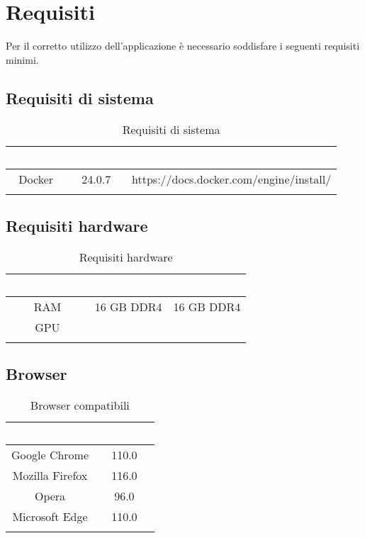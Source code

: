 \chapter{Requisiti} \label{cap:Req}
Per il corretto utilizzo dell'applicazione è necessario soddisfare i seguenti requisiti minimi.

\section{Requisiti di sistema}
\begingroup
\setlength{\tabcolsep}{10pt}
\renewcommand{\arraystretch}{1.5}
\begin{xltabular}{\textwidth}{| c | c | X |}
    \hline
     \textbf{\textcolor{white}{Software}} & \textbf{\textcolor{white}{Versione}} & \textbf{\textcolor{white}{Download}}\\
    \hline
    \endhead
    Docker & 24.0.7 & https://docs.docker.com/engine/install/ \\
    \hline
     \caption{Requisiti di sistema}
    \label{tab:reqsist}
\end{xltabular}
\endgroup

\section{Requisiti hardware}
\begingroup
\setlength{\tabcolsep}{10pt}
\renewcommand{\arraystretch}{1.5}
\begin{xltabular}{\textwidth}{| c | c | c |}
    \hline
     \textbf{\textcolor{white}{Componente}} & \textbf{\textcolor{white}{Minimo}} & \textbf{\textcolor{white}{Consigliato}}\\
    \hline
    \endhead
    RAM & 16 GB DDR4 & 16 GB DDR4 \\
    \hline
    GPU & & \\
    \hline
     \caption{Requisiti hardware}
    \label{tab:reqhard}
\end{xltabular}
\endgroup

\section{Browser}
\begingroup
\setlength{\tabcolsep}{10pt}
\renewcommand{\arraystretch}{1.5}
\begin{xltabular}{\textwidth}{| c | c |}
    \hline
     \textbf{\textcolor{white}{Browser}} & \textbf{\textcolor{white}{Versione}}\\
    \hline
    \endhead
    Google Chrome & 110.0 \\
    \hline
    Mozilla Firefox & 116.0 \\
    \hline
    Opera & 96.0 \\
    \hline
    Microsoft Edge & 110.0 \\
    \hline
     \caption{Browser compatibili}
    \label{tab:reqbrow}
\end{xltabular}
\endgroup


